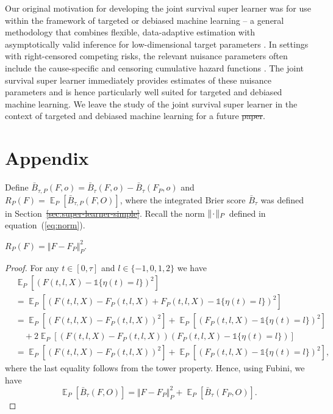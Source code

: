 \documentclass[lineno]{biometrika}
\DeclareMathOperator{\E}{\mathbb{E}} %
\newcommand{\blank}{\makebox[1ex]{\textbf{$\cdot$}}}
\newcommand{\1}{\mathds{1}}
\providecommand{\DIFadd}[1]{{\protect\color{blue}\uwave{#1}}} %
\providecommand{\DIFdel}[1]{{\protect\color{red}\sout{#1}}}                      %
\providecommand{\DIFaddbegin}{} %
\providecommand{\DIFaddend}{} %
\providecommand{\DIFdelbegin}{} %
\providecommand{\DIFdelend}{} %
\begin{document}
Our original motivation for developing the joint survival super
learner was for use within the framework of targeted or debiased
machine learning -- a general methodology that combines flexible,
data-adaptive estimation with asymptotically valid inference for
low-dimensional target parameters
\citep{van2011targeted,chernozhukov2018double}. In settings with
right-censored competing risks, the relevant nuisance parameters often
include the cause-specific and censoring cumulative hazard functions
\citep[e.g.,][]{van2003unified,rytgaard2022targeted}. The joint
survival super learner immediately provides estimates of these
nuisance parameters and is hence particularly well suited for targeted
and debiased machine learning. We leave the study of the joint
survival super learner in the context of targeted and debiased machine
learning for a future \DIFdelbegin \DIFdel{paper}\DIFdelend \DIFaddbegin \DIFadd{work}\DIFaddend .

\appendix

\section*{Appendix}


Define
\( \bar{B}_{\tau,P}(F, o) = \bar{B}_{\tau}(F, o) -
\bar{B}_{\tau}(F_P, o) \) and
\( R_{P}(F) = \E_P{[\bar{B}_{\tau,P}(F, O)]} \), where the
integrated Brier score \( \bar{B}_{\tau} \) was defined in
Section~\DIFdelbegin \DIFdel{\ref{sec:super-learner-simple}}\DIFdelend \DIFaddbegin \DIFadd{\ref{sec:joint-survival-super-learner}}\DIFaddend . Recall the norm
\( \Vert \blank \Vert_{P}\) defined in
equation~(\ref{eq:norm}).

\begin{lemma}
  \label{lemma:norm}
  \( R_{P}(F) = \Vert F - F_P \Vert_{P}^2 \).
\end{lemma}
\begin{proof}
  For any \( t \in [0, \tau] \) and \( l\in \{-1,0,1,2\} \) we have
  \begin{align*}
    & \E_{P}{\left[ (F(t, l, X) - \1{\{\eta(t) = l \}})^2 \right]}
    \\
    & =    \E_{P}{\left[ (F(t, l, X) - F_P(t, l, X) + F_P(t, l, X) - \1{\{\eta(t) = l
      \}})^2 \right]}
    \\
    & =    \E_{P}{\left[ (F(t, l, X) - F_P(t, l, X))^2\right]}
      + \E_{P}{\left[ (F_P(t, l, X) - \1{\{\eta(t) = l \}})^2\right]}
    \\
    & \quad
      + 2\E_{P}{\left[ (F(t, l, X) - F_P(t, l, X))(F_P(t, l, X) - \1{\{\eta(t) = l
      \}})\right]}
    \\
    & =    \E_{P}{\left[ (F(t, l, X) - F_P(t, l, X))^2\right]}
      + \E_{P}{\left[ (F_P(t, l, X) - \1{\{\eta(t) = l \}})^2\right]},
  \end{align*}
  where the last equality follows from the tower property. Hence, using Fubini,
  we have
  \begin{equation*}
    \E_P{[\bar{B}_{\tau}(F, O)]}
    = \Vert F - F_P \Vert_{P}^2 + \E_P{[\bar{B}_{\tau}(F_P, O)]}.
  \end{equation*}
\end{proof}
\end{document}
